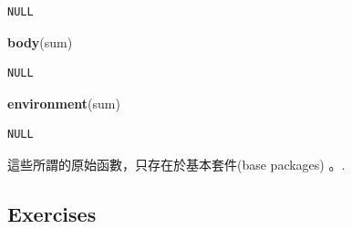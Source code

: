 \documentclass[]{book}
\newenvironment{Shaded}{\begin{snugshade}}{\end{snugshade}}
\newcommand{\KeywordTok}[1]{\textcolor[rgb]{0.13,0.29,0.53}{\textbf{#1}}}
\newcommand{\NormalTok}[1]{#1}
\theoremstyle{definition}
\theoremstyle{definition}
\theoremstyle{definition}
\theoremstyle{remark}
\begin{document}
\begin{verbatim}
NULL
\end{verbatim}

\begin{Shaded}
\begin{Highlighting}[]
\KeywordTok{body}\NormalTok{(sum)}
\end{Highlighting}
\end{Shaded}

\begin{verbatim}
NULL
\end{verbatim}

\begin{Shaded}
\begin{Highlighting}[]
\KeywordTok{environment}\NormalTok{(sum)}
\end{Highlighting}
\end{Shaded}

\begin{verbatim}
NULL
\end{verbatim}

這些所謂的原始函數，只存在於基本套件(base packages) 。.

\hypertarget{exercises}{%
\subsection{Exercises}\label{exercises}}
\end{document}
